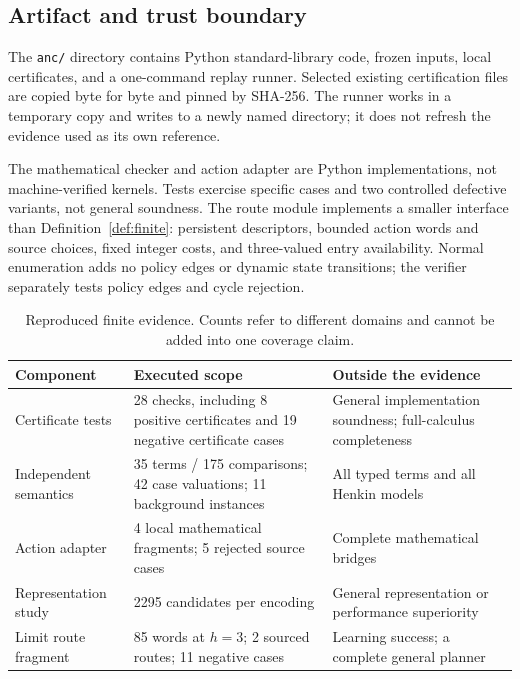 \documentclass[11pt,a4paper]{article}
\theoremstyle{remark}
\begin{document}
\subsection{Artifact and trust boundary}
The \texttt{anc/} directory contains Python standard-library code, frozen
inputs, local certificates, and a one-command replay runner.
Selected existing certification files are copied byte for byte and pinned by
SHA-256. The runner works in a temporary copy and writes to a newly named
directory; it does not refresh the evidence used as its own reference.

The mathematical checker and action adapter are Python implementations,
not machine-verified kernels. Tests exercise specific cases and two controlled
defective variants, not general soundness. The route module implements a
smaller interface than Definition~\ref{def:finite}: persistent descriptors,
bounded action words and source choices, fixed integer costs, and three-valued
entry availability. Normal enumeration adds no policy edges or dynamic state
transitions; the verifier separately tests policy edges and cycle rejection.

\begin{table}[t]
\centering\small
\begin{tabularx}{\linewidth}{@{}lXX@{}}
\toprule Component & Executed scope & Outside the evidence\\\midrule
Certificate tests & 28 checks, including 8 positive certificates and 19 negative
certificate cases & General implementation soundness; full-calculus completeness\\
Independent semantics & 35 terms / 175 comparisons; 42 case valuations;
11 background instances & All typed terms and all Henkin models\\
Action adapter & 4 local mathematical fragments; 5 rejected source cases
& Complete mathematical bridges\\
Representation study & 2295 candidates per encoding & General representation or performance superiority\\
Limit route fragment & 85 words at \(h=3\); 2 sourced routes; 11 negative cases
& Learning success; a complete general planner\\
\bottomrule
\end{tabularx}
\caption{Reproduced finite evidence. Counts refer to different domains and
cannot be added into one coverage claim.}
\label{tab:coverage}
\end{table}
\end{document}
